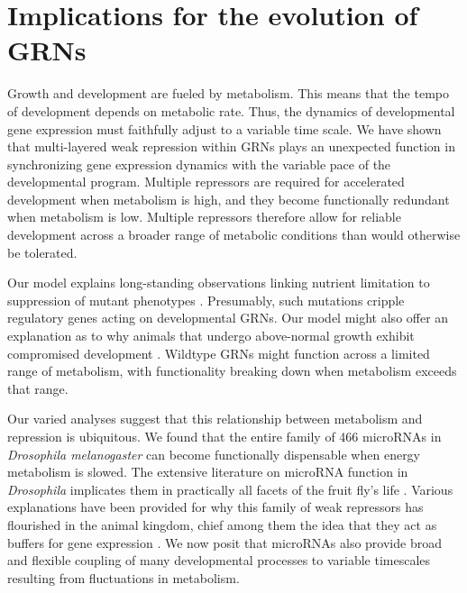\section{Implications for the evolution of GRNs}

Growth and development are fueled by metabolism. This means that the tempo of development depends on metabolic rate. Thus, the dynamics of developmental gene expression must faithfully adjust to a variable time scale. We have shown that multi-layered weak repression within GRNs plays an unexpected function in synchronizing gene expression dynamics with the variable pace of the developmental program. Multiple repressors are required for accelerated development when metabolism is high, and they become functionally redundant when metabolism is low. Multiple repressors therefore allow for reliable development across a broader range of metabolic conditions than would otherwise be tolerated.

Our model explains long-standing observations linking nutrient limitation to suppression of mutant phenotypes \cite{Morgan1915,Morgan1929}. Presumably, such mutations cripple regulatory genes acting on developmental GRNs. Our model might also offer an explanation as to why animals that undergo above-normal growth exhibit compromised development \cite{Arendt1997,Metcalfe2001}. Wildtype GRNs might function across a limited range of metabolism, with functionality breaking down when metabolism exceeds that range.

Our varied analyses suggest that this relationship between metabolism and repression is ubiquitous. We found that the entire family of 466 microRNAs in \textit{Drosophila melanogaster} can become functionally dispensable when energy metabolism is slowed. The extensive literature on microRNA function in \textit{Drosophila} implicates them in practically all facets of the fruit fly's life \cite{Bushati2007,Carthew2017}. Various explanations have been provided for why this family of weak repressors has flourished in the animal kingdom, chief among them the idea that they act as buffers for gene expression \cite{Ebert2012}. We now posit that microRNAs also provide broad and flexible coupling of many developmental processes to variable timescales resulting from fluctuations in metabolism.

